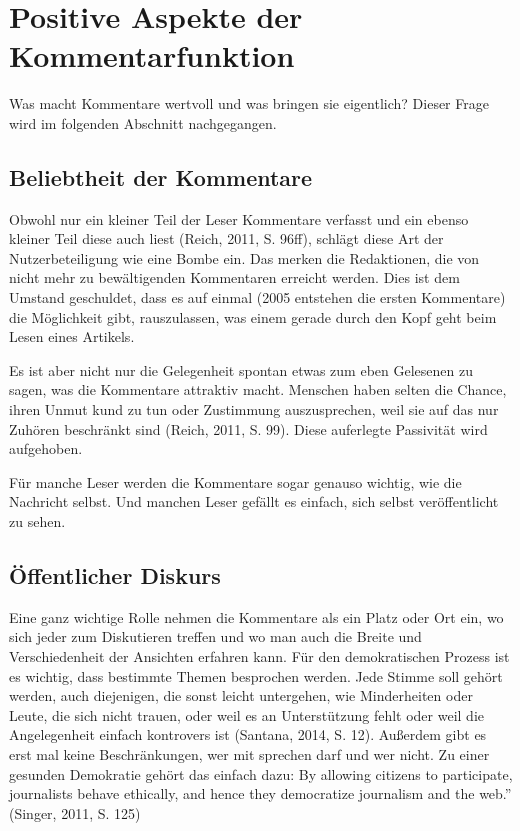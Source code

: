 \chapter{Positive Aspekte der Kommentarfunktion}

Was macht Kommentare wertvoll und was bringen sie eigentlich? Dieser Frage wird
im folgenden Abschnitt nachgegangen.


\section{Beliebtheit der Kommentare}

Obwohl nur ein kleiner Teil der Leser Kommentare verfasst und ein ebenso kleiner
Teil diese auch liest (Reich, 2011, S.  96ff), schlägt diese Art der
Nutzerbeteiligung wie eine Bombe ein. Das merken die Redaktionen, die von nicht
mehr zu bewältigenden Kommentaren erreicht werden. Dies ist dem Umstand
geschuldet, dass es auf einmal (2005 entstehen die ersten Kommentare) die
Möglichkeit gibt, rauszulassen, was einem gerade durch den Kopf geht beim Lesen
eines Artikels.

Es ist aber nicht nur die Gelegenheit spontan etwas zum eben Gelesenen zu sagen,
was die Kommentare attraktiv macht. Menschen haben selten die Chance, ihren
Unmut kund zu tun oder Zustimmung auszusprechen, weil sie auf das nur Zuhören
beschränkt sind (Reich, 2011, S. 99). Diese auferlegte Passivität wird
aufgehoben.

Für manche Leser werden die Kommentare sogar genauso wichtig, wie die Nachricht
selbst. Und manchen Leser gefällt es einfach, sich selbst veröffentlicht zu
sehen.


\section{Öffentlicher Diskurs}

Eine ganz wichtige Rolle nehmen die Kommentare als ein Platz oder Ort ein, wo
sich jeder zum Diskutieren treffen und wo man auch die Breite und
Verschiedenheit der Ansichten erfahren kann. Für den demokratischen Prozess ist
es wichtig, dass bestimmte Themen besprochen werden. Jede Stimme soll gehört
werden, auch diejenigen, die sonst leicht untergehen, wie Minderheiten oder
Leute, die sich nicht trauen, oder weil es an Unterstützung fehlt oder weil die
Angelegenheit einfach kontrovers ist (Santana, 2014, S. 12). Außerdem gibt es
erst mal keine Beschränkungen, wer mit sprechen darf und wer nicht.  Zu einer
gesunden Demokratie gehört das einfach dazu: \glqq By allowing citizens to
participate, journalists behave ethically, and hence they democratize journalism
and the web.'' (Singer, 2011, S. 125)

